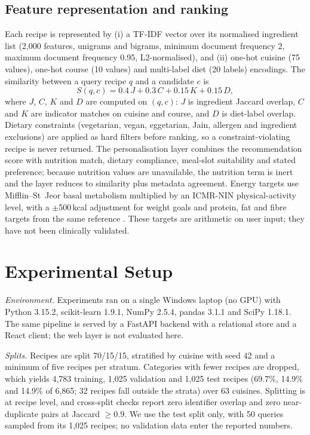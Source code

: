\documentclass[conference]{IEEEtran}
\begin{document}
\subsection{Feature representation and ranking}
\label{sec:features}

Each recipe is represented by (i) a TF-IDF vector over its normalised ingredient
list (2{,}000 features, unigrams and bigrams, minimum document frequency 2,
maximum document frequency 0.95, L2-normalised), and (ii) one-hot cuisine (75 values),
one-hot course (10 values) and multi-label diet (20 labels) encodings. The
similarity between a query recipe $q$ and a candidate $c$ is
\begin{equation}
\label{eq:score}
S(q,c) = 0.4\,J + 0.3\,C + 0.15\,K + 0.15\,D ,
\end{equation}
where $J$, $C$, $K$ and $D$ are computed on $(q,c)$: $J$ is ingredient Jaccard
overlap, $C$ and $K$ are indicator matches on cuisine and course, and $D$ is
diet-label overlap. Dietary constraints (vegetarian,
vegan, eggetarian, Jain, allergen and ingredient exclusions) are applied as hard
filters before ranking, so a constraint-violating recipe is never returned. The
personalisation layer combines the recommendation score with nutrition match,
dietary compliance, meal-slot suitability and stated preference; because nutrition
values are unavailable, the nutrition term is inert and the layer reduces to
similarity plus metadata agreement. Energy targets use Mifflin--St~Jeor basal
metabolism \cite{mifflin1990} multiplied by an ICMR-NIN physical-activity level,
with a $\pm$500\,kcal adjustment for weight goals and protein, fat and fibre
targets from the same reference \cite{icmrnin2020}. These targets are arithmetic on
user input; they have not been clinically validated.

\section{Experimental Setup}
\label{sec:setup}

\emph{Environment.} Experiments ran on a single Windows laptop (no GPU) with
Python 3.15.2, scikit-learn 1.9.1, NumPy 2.5.4, pandas 3.1.1 and SciPy 1.18.1. The
same pipeline is served by a FastAPI backend with a relational store and a React
client; the web layer is not evaluated here.

\emph{Splits.} Recipes are split 70/15/15, stratified by cuisine with seed 42 and a
minimum of five recipes per stratum. Categories with fewer recipes are dropped,
which yields 4{,}783 training, 1{,}025 validation and 1{,}025 test recipes (69.7\%,
14.9\% and 14.9\% of 6{,}865; 32 recipes fall outside the strata) over 63 cuisines.
Splitting is at recipe level, and cross-split checks report zero identifier overlap
and zero near-duplicate pairs at Jaccard $\geq 0.9$. We use the test split only,
with 50 queries sampled from its 1{,}025 recipes; no validation data enter the
reported numbers.
\end{document}
